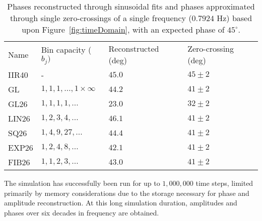 \begin{table}
\begin{tabular}{llll}
\hline
Name &Bin capacity ($b_j)$ &Reconstructed (deg) &Zero-crossing (deg)\\ 
IIR40 &- &$45.0$ &$45\pm 2$\\ 
GL &${1,1,1,\dots,1\times\infty}$  &$44.2$ &$41\pm 2$\\ 
GL26 &${1,1,1,1,\dots}$ &$23.0$ &$32\pm 2$\\ 
LIN26 &${1,2,3,4,\dots}$ &$46.1$ &$41\pm 2$\\ 
SQ26 &${1,4,9,27,\dots}$ &$44.4$ &$41\pm 2$\\ 
EXP26 &${1,2,4,8,\dots}$ &$42.1$ &$41\pm2$\\ 
FIB26 &${1,1,2,3,\dots}$ &$43.0$ &$41\pm 2$\\
\hline
\end{tabular}
\caption{Phases reconstructed through sinusoidal fits and phases approximated through single zero-crossings of a single frequency ($0.7924$ Hz) based upon Figure~\ref{fig:timeDomain}, with an expected phase of $45^\circ$.}
\label{tab:phaseRecon}
\end{table}

The simulation has successfully been run for up to $1,000,000$ time
steps, limited primarily by memory considerations due to the storage
necessary for phase and amplitude reconstruction. At this long
simulation duration, amplitudes and phases over six decades in
frequency are obtained.
